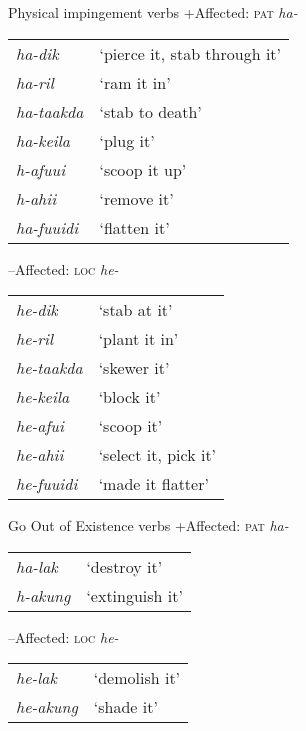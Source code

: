 \documentclass[output=paper]{LSP/langsci}
\begin{document}
\ea \label{03-kl-ex:31}
Physical impingement verbs \citep[227]{Kratochviletal2015Degrees}
\ea \label{03-kl-ex:31b}
+Affected: \textsc{pat} \textit{ha-}\\
\begin{tabularx}{\textwidth}{ll}
\textit{ha-dik} & ‘pierce it, stab through it’\\
\textit{ha-ril} & ‘ram it in’\\
\textit{ha-taakda}& ‘stab to death’\\
\textit{ha-keila} & ‘plug it’\\
\textit{h-afuui} & ‘scoop it up’\\
\textit{h-ahii} & ‘remove it’\\
\textit{ha-fuuidi} & ‘flatten it’\\
\end{tabularx}

\ex \label{03-kl-ex:31a}
--Affected: \textsc{loc} \textit{he-}\\
\begin{tabularx}{\textwidth}{ll}
\textit{he-dik} & ‘stab at it’\\
\textit{he-ril} & ‘plant it in’\\
\textit{he-taakda} & ‘skewer it’\\
\textit{he-keila} & ‘block it’\\
\textit{he-afui} & ‘scoop it’\\
\textit{he-ahii} & ‘select it, pick it’\\
\textit{he-fuuidi} & ‘made it flatter’\\
\end{tabularx}
\z
\z

\ea \label{03-kl-ex:32}
Go Out of Existence verbs \citep[228]{Kratochviletal2015Degrees}
\ea \label{03-kl-ex:32b}
+Affected: \textsc{pat} \textit{ha-}\\
\begin{tabularx}{\textwidth}{ll}
\textit{ha-lak} & ‘destroy it’\\
\textit{h-akung} & ‘extinguish it’\\
\end{tabularx}

\ex \label{03-kl-ex:32a}
--Affected: \textsc{loc} \textit{he-}\\
\begin{tabularx}{\textwidth}{ ll }
\textit{he-lak} & ‘demolish it’\\
\textit{he-akung} & ‘shade it’\\
\end{tabularx}
\z
\z
\end{document}

